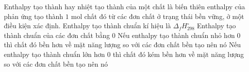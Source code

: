 \documentclass[Main.tex]{subfiles}
\begin{document}
	\begin{ex}
		Enthalpy tạo thành hay nhiệt tạo thành của một chất là biến thiên enthalpy của phản ứng tạo thành $1$ mol chất đó từ các đơn chất ở trạng thái bền vững, ở một điều kiện xác định.
		\choiceTF
		{\True Enthalpy tạo thành chuẩn kí hiệu là $\Delta_f H_{298}^\circ$}
		{Enthalpy tạo thành chuẩn của các đơn chất bằng $0$}
		{\True Nếu enthalpy tạo thành chuẩn nhỏ hơn $0$ thì chất đó bền hơn về mặt năng lượng so với các đơn chất bền tạo nên nó}
		{\True Nếu enthalpy tạo thành chuẩn lớn hơn $0$ thì chất đó kém bền hơn về mặt năng lượng so với các đơn chất bền tạo nên nó}
	\end{ex}
	
\end{document}
